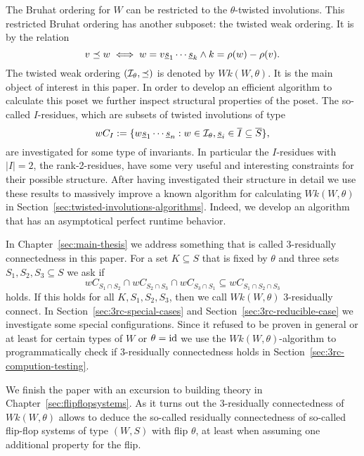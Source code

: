 The Bruhat ordering for $W$ can be restricted to the $\theta$-twisted involutions. This restricted Bruhat ordering has another subposet: the twisted weak ordering. It is by the relation
$$ v \preceq w \iff w = v \underline{s}_1 \cdots \underline{s}_k \wedge k = \rho(w) - \rho(v). $$
The twisted weak ordering $(\mathcal{I}_{\theta}, \preceq)$ is denoted by $Wk(W,\theta)$. It is the main object of interest in this paper. In order to develop an efficient algorithm to calculate this poset we further inspect structural properties of the poset. The so-called $I$-residues, which are subsets of twisted involutions of type
$$w C_I := \{ w \underline{s}_1 \cdots \underline{s}_n : w \in \mathcal{I}_{\theta}, \underline{s}_i \in \overline I \subseteq \overline S \}, $$
are investigated for some type of invariants. In particular the $I$-residues with $|I|=2$, the rank-2-residues, have some very useful and interesting constraints for their possible structure. After having investigated their structure in detail we use these results to massively improve a known algorithm for calculating $Wk(W,\theta)$ in Section~\ref{sec:twisted-involutions-algorithms}. Indeed, we develop an algorithm that has an asymptotical perfect runtime behavior.

In Chapter~\ref{sec:main-thesis} we address something that is called 3-residually connectedness in this paper. For a set $K \subseteq S$ that is fixed by $\theta$ and three sets $S_1,S_2,S_3 \subseteq S$ we ask if
$$ w C_{S_1 \cap S_2} \cap w C_{S_2 \cap S_3} \cap w C_{S_3 \cap S_1} \subseteq w C_{S_1 \cap S_2 \cap S_3} $$
holds. If this holds for all $K,S_1,S_2,S_3$, then we call $Wk(W,\theta)$ 3-residually connect. In Section~\ref{sec:3rc-special-cases} and Section~\ref{sec:3rc-reducible-case} we investigate some special configurations. Since it refused to be proven in general or at least for certain types of $W$ or $\theta = \operatorname{id}$ we use the $Wk(W,\theta)$-algorithm to programmatically check if 3-residually connectedness holds in Section~\ref{sec:3rc-compution-testing}.

We finish the paper with an excursion to building theory in Chapter~\ref{sec:flipflopsystems}. As it turns out the 3-residually connectedness of $Wk(W,\theta)$ allows to deduce the so-called residually connectedness of so-called flip-flop systems of type $(W,S)$ with flip $\theta$, at least when assuming one additional property for the flip.